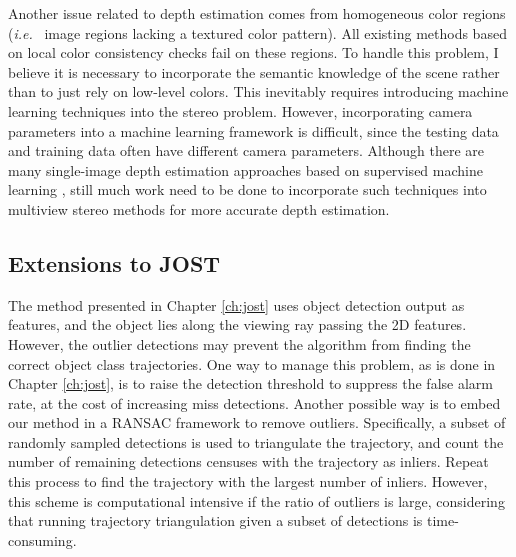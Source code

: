 Another issue related to depth estimation comes from homogeneous color regions (\emph{i.e.}~ image regions lacking a textured color pattern). All existing methods based on local color consistency checks fail on these regions. To handle this problem, I believe it is necessary to incorporate the semantic knowledge of the scene rather than to just rely on low-level colors. This inevitably requires introducing machine learning techniques into the stereo problem. However, incorporating camera parameters into a machine learning framework is difficult, since the testing data and training data often have different camera parameters. Although there are many single-image depth estimation approaches based on supervised machine learning  \cite{Hoiem_CGRAPH2005,Saxena_IJCV2008,eigen2014depth,Liu2014,zhuo2015indoor}, still much work need to be done to incorporate such techniques into multiview stereo methods for more accurate depth estimation.

\subsection{Extensions to JOST}

The method presented in Chapter \ref{ch:jost} uses object detection output as features, and the object lies along the viewing ray passing the 2D features. However, the outlier detections may prevent the algorithm from finding the correct object class trajectories. One way to manage this problem, as is done in Chapter \ref{ch:jost}, is to raise the detection threshold to suppress the false alarm rate, at the cost of increasing miss detections. Another possible way is to embed our method in a RANSAC framework \cite{Hartley2004} to remove outliers. Specifically, a subset of randomly sampled detections is used to triangulate the trajectory, and count the number of remaining detections censuses with the trajectory as inliers. Repeat this process to find the trajectory with the largest number of inliers. However, this scheme is computational intensive if the ratio of outliers is large, considering that running trajectory triangulation given a subset of detections is time-consuming. 

